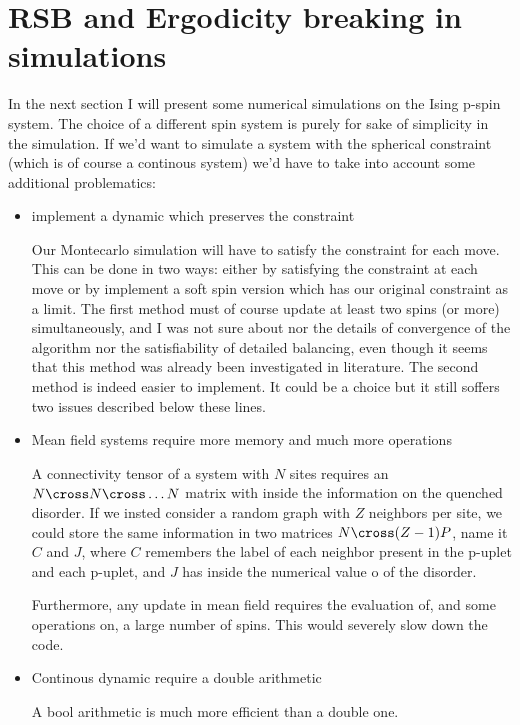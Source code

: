 \documentclass{article}
\begin{document}
\section{RSB and Ergodicity breaking in simulations}

In the next section I will present some numerical simulations on the Ising p-spin system. 
The choice of a different spin system is purely for sake of simplicity in the simulation.
If we'd want to simulate a system with the spherical constraint (which is of course a continous system)
we'd have to take into account some additional problematics: 

\begin{itemize}
\item {implement a dynamic which preserves the constraint}

Our Montecarlo simulation will have to satisfy the constraint for each move. This can be done in two ways: 
either by satisfying the constraint at each move or by implement a soft spin version which has our original
constraint as a limit. 
The first method must of course update at least two spins (or more) simultaneously, and I was not sure about
nor the details of convergence of the algorithm nor the satisfiability of detailed balancing, even though it seems that this method was already been investigated
in literature.
The second method is indeed easier to implement. It could be a choice but it still soffers two issues described below 
these lines.

\item {Mean field systems require more memory and much more operations}

A connectivity tensor of a system with $N$ sites requires an $N \cross N \cross \dots N$ matrix with inside the information
on the quenched disorder. If we insted consider a random graph with $Z$ neighbors per site, 
we could store the same information in two matrices $N \cross (Z-1)P$, name it $C$ and $J$, where $C$ remembers 
the label of each neighbor present in the p-uplet and each p-uplet, and $J$ has inside the numerical value o
of the disorder.

Furthermore, any update in mean field requires the evaluation of, and some operations 
on, a large number of spins. This would severely slow down the code.

\item {Continous dynamic require a double arithmetic}

A bool arithmetic is much more efficient than a double one. 

\end{itemize}
\end{document}
